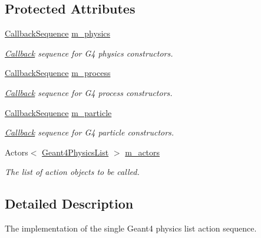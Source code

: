 \subsection*{Protected Attributes}
\begin{DoxyCompactItemize}
\item 
\hyperlink{struct_d_d4hep_1_1_callback_sequence}{Callback\+Sequence} \hyperlink{class_d_d4hep_1_1_simulation_1_1_geant4_physics_list_action_sequence_a13902a9fa275fd80e465f51e1e32439f}{m\+\_\+physics}
\begin{DoxyCompactList}\small\item\em \hyperlink{class_d_d4hep_1_1_callback}{Callback} sequence for G4 physics constructors. \end{DoxyCompactList}\item 
\hyperlink{struct_d_d4hep_1_1_callback_sequence}{Callback\+Sequence} \hyperlink{class_d_d4hep_1_1_simulation_1_1_geant4_physics_list_action_sequence_ae2f6d60bc1654668ee661e9010b5fa82}{m\+\_\+process}
\begin{DoxyCompactList}\small\item\em \hyperlink{class_d_d4hep_1_1_callback}{Callback} sequence for G4 process constructors. \end{DoxyCompactList}\item 
\hyperlink{struct_d_d4hep_1_1_callback_sequence}{Callback\+Sequence} \hyperlink{class_d_d4hep_1_1_simulation_1_1_geant4_physics_list_action_sequence_ab83212b1da37b0e855097936968be22f}{m\+\_\+particle}
\begin{DoxyCompactList}\small\item\em \hyperlink{class_d_d4hep_1_1_callback}{Callback} sequence for G4 particle constructors. \end{DoxyCompactList}\item 
Actors$<$ \hyperlink{class_d_d4hep_1_1_simulation_1_1_geant4_physics_list}{Geant4\+Physics\+List} $>$ \hyperlink{class_d_d4hep_1_1_simulation_1_1_geant4_physics_list_action_sequence_a7b456f14e717d23f85827b8e0c8bab72}{m\+\_\+actors}
\begin{DoxyCompactList}\small\item\em The list of action objects to be called. \end{DoxyCompactList}\end{DoxyCompactItemize}


\subsection{Detailed Description}
The implementation of the single Geant4 physics list action sequence. 

